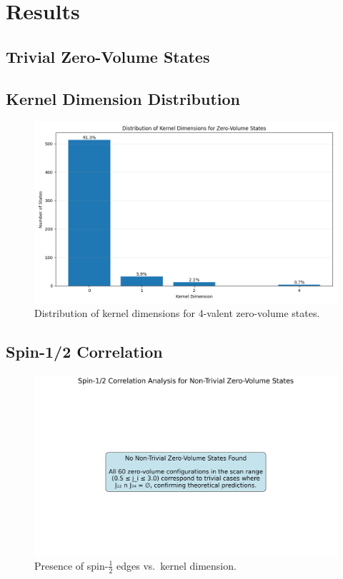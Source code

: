 \documentclass[11pt]{article}
\begin{document}
\section{Results}
\subsection{Trivial Zero-Volume States}


\subsection{Kernel Dimension Distribution}
\begin{figure}[ht]
  \centering
  \includegraphics[width=0.8\linewidth]{kernel_dimension_distribution.png}
  \caption{Distribution of kernel dimensions for 4-valent zero-volume states.}
  \label{fig:kernel_dim_dist}
\end{figure}

\subsection{Spin-1/2 Correlation}
\begin{figure}[ht]
  \centering
  \includegraphics[width=0.8\linewidth]{spin_half_correlation.png}
  \caption{Presence of spin-$\tfrac{1}{2}$ edges vs.\ kernel dimension.}
  \label{fig:spin_half_corr}
\end{figure}
\end{document}
